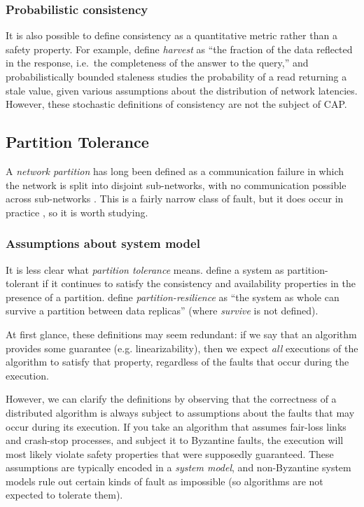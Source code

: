 \documentclass[fleqn,12pt,lineno]{wlpeerj} %
\begin{document}
\subsubsection{Probabilistic consistency}

It is also possible to define consistency as a quantitative metric rather than a safety property.
For example, \citet{Fox1999bs} define \emph{harvest} as ``the fraction of the data
reflected in the response, i.e.\ the completeness of the answer to the query,'' and
probabilistically bounded staleness \citep{Bailis2012to} studies the probability of a read returning
a stale value, given various assumptions about the distribution of network latencies. However, these
stochastic definitions of consistency are not the subject of CAP.

\subsection{Partition Tolerance}\label{sec:partitions}

A \emph{network partition} has long been defined as a communication failure in which the network is
split into disjoint sub-networks, with no communication possible across
sub-networks \citep{Johnson1975we}. This is a fairly narrow class of fault, but it does occur in
practice \citep{Bailis2014jx}, so it is worth studying.

\subsubsection{Assumptions about system model}\label{sec:systemmodel}

It is less clear what \emph{partition tolerance} means. \citet{Gilbert2002il}
define a system as partition-tolerant if it continues to satisfy the consistency and availability
properties in the presence of a partition. \citet{Fox1999bs} define
\emph{partition-resilience} as ``the system as whole can survive a partition between data replicas''
(where \emph{survive} is not defined).

At first glance, these definitions may seem redundant: if we say that an algorithm provides some
guarantee (e.g. linearizability), then we expect \emph{all} executions of the algorithm to satisfy
that property, regardless of the faults that occur during the execution.

However, we can clarify the definitions by observing that the correctness of a distributed algorithm
is always subject to assumptions about the faults that may occur during its execution. If you take
an algorithm that assumes fair-loss links and crash-stop processes, and subject it to Byzantine
faults, the execution will most likely violate safety properties that were supposedly guaranteed.
These assumptions are typically encoded in a \emph{system model}, and non-Byzantine system models
rule out certain kinds of fault as impossible (so algorithms are not expected to tolerate them).
\end{document}
